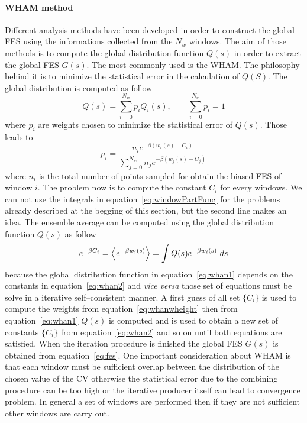 \paragraph{\textbf{WHAM method}} Different analysis methods have been developed in order to construct the global \ac{FES} using the informations collected from the $N_w$ windows. The aim of those methods is to compute the global distribution function $Q(s)$ in order to extract the global \ac{FES} $G(s)$. The most commonly used is the \acf{WHAM}. The philosophy behind it is to minimize the statistical error in the calculation of $Q(S)$. The global distribution is computed as follow
\begin{equation}
	Q(s) = \sum_{i=0}^{N_w} p_i Q_i(s), \qquad \sum_{i=0}^{N_w} p_i = 1
	\label{eq:whan1}
\end{equation}
where $p_i$ are weights chosen to minimize the statistical error of $Q(s)$. Those leads to
\begin{equation}
	p_i = \frac{n_ie^{-\beta (w_i(s) - C_i)}}{\sum_{j=0}^{N_w} n_je^{-\beta (w_j(s) - C_j)}}
	\label{eq:whanwheight}
\end{equation}
where $n_i$ is the total number of points sampled for obtain the biased \ac{FES} of window $i$. The problem now is to compute the constant $C_i$ for every windows. We can not use the integrals in equation~\eqref{eq:windowPartFunc} for the problems already described at the begging of this section, but the second line makes an idea. The ensemble average can be computed using the global distribution function $Q(s)$ as follow
\begin{equation}
	e^{-\beta C_i} = \left \langle e^{-\beta w_i(s)} \right \rangle = \int Q(s) e^{-\beta w_i(s)}\ ds
	\label{eq:whan2}
\end{equation} 
because the global distribution function in equation~\eqref{eq:whan1} depends on the constants in equation~\eqref{eq:whan2} and \textit{vice versa} those set of equations must be solve in a iterative self--consistent manner. A first guess of all set $\{C_i\}$ is used to compute the weights from equation~\eqref{eq:whanwheight} then from equation~\eqref{eq:whan1} $Q(s)$ is computed and is used to obtain a new set of constants $\{C_i\}$ from equation~\eqref{eq:whan2} and so on until both equations are satisfied. When the iteration procedure is finished the global \ac{FES} $G(s)$ is obtained from equation~\eqref{eq:fes}. One important consideration about \ac{WHAM} is that each window must be sufficient overlap between the distribution of the chosen value of the \ac{CV} otherwise the statistical error due to the combining procedure can be too high or the iterative producer itself can lead to convergence problem. In general a set of windows are performed then if they are not sufficient other windows are carry out.


